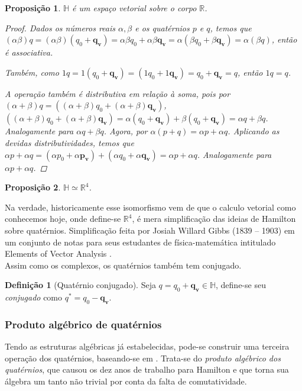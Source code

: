 \documentclass[a4paper,12pt]{report}
\theoremstyle{plain}
\newtheorem{proposicao}{Proposição}[section]
\theoremstyle{definition}
\newtheorem{definicao}{Definição}[section]
\begin{document}
	\begin{proposicao}
		$\mathbb{H}$ é um espaço vetorial sobre o corpo $\mathbb{R}$.
		\begin{proof}
			Dados os números reais $\alpha,\beta$ e os quatérnios $p$ e $q$, temos que $(\alpha \beta)q=(\alpha \beta)(q_0+\mathbf{q_v})=\alpha \beta q_0+\alpha \beta \mathbf{q_v}=\alpha(\beta q_0+\beta \mathbf{q_v})=\alpha(\beta q)$, então é associativa.
			
			Também, como $1q=1(q_0+\mathbf{q_v})=(1q_0+1\mathbf{q_v})=q_0+\mathbf{q_v}=q$, então $1q=q$.
			
			A operação também é distributiva em relação à soma, pois por $(\alpha + \beta)q=((\alpha + \beta)q_0 + (\alpha + \beta)\mathbf{q_v})$, $((\alpha + \beta)q_0 + (\alpha + \beta)\mathbf{q_v})=\alpha(q_0+\mathbf{q_v})+\beta(q_0+\mathbf{q_v})=\alpha q+\beta q$. Analogamente para $\alpha q+\beta q$. Agora, por $\alpha(p+q)=\alpha p+\alpha q$. Aplicando as devidas distributividades, temos que $\alpha p+\alpha q=(\alpha p_0+\alpha\mathbf{p_v})+(\alpha q_0+\alpha\mathbf{q_v})=\alpha p+\alpha q$. Analogamente para $\alpha p+\alpha q$.
		\end{proof}
	\end{proposicao}
	
	\begin{proposicao}
		$\mathbb{H} \simeq \mathbb{R}^4$.
	\end{proposicao}

	Na verdade, historicamente esse isomorfismo vem de que o calculo vetorial como conhecemos hoje, onde define-se $\mathbb{R}^4$, é mera simplificação das ideias de Hamilton sobre quatérnios. Simplificação feita por Josiah Willard Gibbs (1839 – 1903) em um conjunto de notas para seus estudantes de física-matemática intitulado Elements of Vector Analysis \cite{AlgebraAbstrata2BienalSBM}.
	\\
	
	Assim como os complexos, os quatérnios também tem conjugado. 
	\begin{definicao}[Quatérnio conjugado]
		Seja $q = q_0 + \mathbf{q_v} \in \mathbb{H}$, define-se seu \textit{conjugado} como $q^* = q_0 - \mathbf{q_v}$.
	\end{definicao}
	
	\subsubsection{Produto algébrico de quatérnios}
	Tendo as estruturas algébricas já estabelecidas, pode-se construir uma terceira operação dos quatérnios, baseando-se em \cite{QuaterniosAndRotationsKuipers}. Trata-se do \textit{produto algébrico dos quatérnios}, que causou os dez anos de trabalho para Hamilton e que torna sua álgebra um tanto não trivial por conta da falta de comutatividade.
	\\
	
\end{document}
